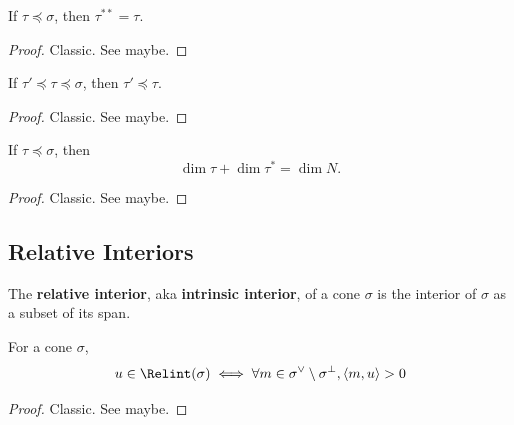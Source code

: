 \begin{proposition}
  \label{1-2-10-double-dual-face-dual-face}

  If $\tau \preceq \sigma$, then $\tau^{**} = \tau$.
\end{proposition}
\begin{proof}

  Classic. See \cite{Oda_1988} maybe.
\end{proof}


\begin{proposition}
  \label{1-2-10-dual-face-antitone}

  If $\tau' \preceq \tau \preceq \sigma$, then $\tau' \preceq \tau$.
\end{proposition}
\begin{proof}

  Classic. See \cite{Oda_1988} maybe.
\end{proof}


\begin{proposition}
  \label{1-2-10-dim-dual-face}

  If $\tau \preceq \sigma$, then
  $$\dim \tau + \dim \tau^* = \dim N.$$
\end{proposition}
\begin{proof}

  Classic. See \cite{Oda_1988} maybe.
\end{proof}


\subsection{Relative Interiors}


\begin{definition}
  \label{1-2-rel-interior}
  \leanok

  The {\bf relative interior}, aka {\bf intrinsic interior}, of a cone $\sigma$ is the interior of $\sigma$ as a subset of its span.
\end{definition}


\begin{lemma}
  \label{1-2-rel-interior-inner}

  For a cone $\sigma$,
  $$u \in \Relint(\sigma) \iff \forall m \in \sigma^\vee \setminus \sigma^\perp, \langle m, u\rangle > 0$$
\end{lemma}
\begin{proof}

  Classic. See \cite{Oda_1988} maybe.
\end{proof}


